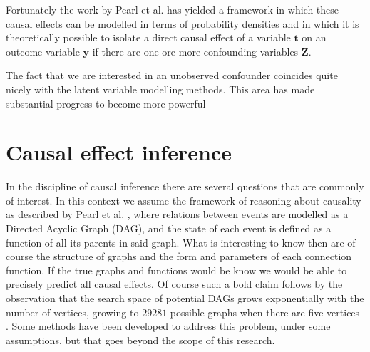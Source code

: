 \documentclass{report}
\newcommand{\bt}{\mathbf{t}}
\newcommand{\bx}{\mathbf{x}}
\newcommand{\by}{\mathbf{y}}
\newcommand{\bZ}{\mathbf{Z}}
\begin{document}
Fortunately the work by Pearl et al.\cite{pearl2009causal} \cite{pearl1995causal} has yielded a framework in which these causal effects can be modelled in terms of probability densities and in which it is theoretically possible to isolate a direct causal effect of a variable $\bt$ on an outcome variable $\by$ if there are one ore more confounding variables $\bZ$.

The fact that we are interested in an unobserved confounder coincides quite nicely with the latent variable modelling methods. This area has made substantial progress to become more powerful




\chapter{Causal effect inference}
In the discipline of causal inference there are several questions that are commonly of interest. In this context we assume the framework of reasoning about causality as described by Pearl et al. \cite{pearl2009causal}, where relations between events are modelled as a Directed Acyclic Graph (DAG), and the state of each event is defined as a function of all its parents in said graph. What is interesting to know then are of course the structure of graphs and the form and parameters of each connection function. If the true graphs and functions would be know we would be able to precisely predict all causal effects. Of course such a bold claim follows by the observation that the search space of potential DAGs grows exponentially with the number of vertices, growing to $29281$ possible graphs when there are five vertices \cite{robinson1977counting}. Some methods have been developed to address this problem, under some assumptions, but that goes beyond the scope of this research.
\end{document}
